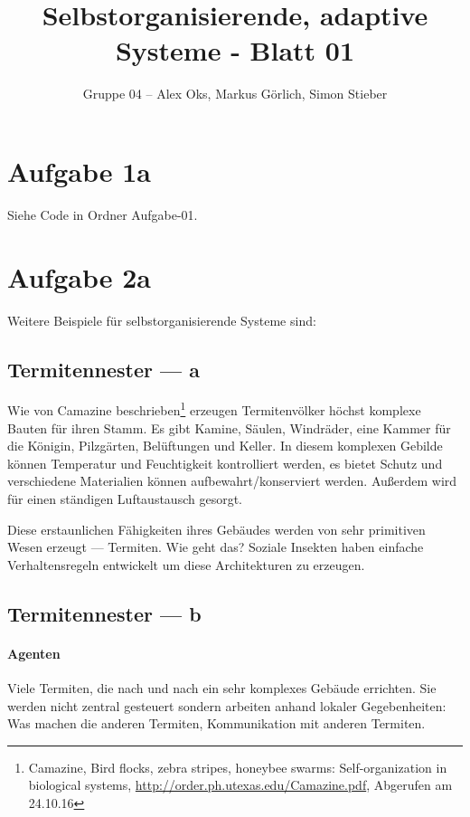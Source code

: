 \documentclass[10pt]{article}%
\theoremstyle{nonumberplain}
\begin{document}
\author{Gruppe 04 -- Alex Oks, Markus Görlich, Simon Stieber}
\title{Selbstorganisierende, adaptive Systeme - Blatt 01}

\maketitle %
\section{Aufgabe 1a}
Siehe Code in Ordner Aufgabe-01.
\section{Aufgabe 2a}
Weitere Beispiele für selbstorganisierende Systeme sind:
\subsection{Termitennester --- a}
Wie von Camazine beschrieben\footnote{Camazine, Bird flocks, zebra stripes, honeybee swarms:
	Self-organization in biological systems, \url{http://order.ph.utexas.edu/Camazine.pdf}, Abgerufen am 24.10.16}
erzeugen Termitenvölker höchst komplexe Bauten für ihren Stamm.
Es gibt Kamine, Säulen, Windräder, eine Kammer für die Königin, Pilzgärten, Belüftungen und Keller.
In diesem komplexen Gebilde können Temperatur und Feuchtigkeit kontrolliert werden, es bietet Schutz und verschiedene Materialien können aufbewahrt/konserviert werden.
Außerdem wird für einen ständigen Luftaustausch gesorgt.

Diese erstaunlichen Fähigkeiten ihres Gebäudes werden von sehr primitiven Wesen erzeugt --- Termiten.
Wie geht das?
Soziale Insekten haben einfache Verhaltensregeln entwickelt um diese Architekturen zu erzeugen.

\subsection{Termitennester --- b}
\paragraph{Agenten}
Viele Termiten, die nach und nach ein sehr komplexes Gebäude errichten.
Sie werden nicht zentral gesteuert sondern arbeiten anhand lokaler Gegebenheiten:
Was machen die anderen Termiten, Kommunikation mit anderen Termiten.
\end{document}
